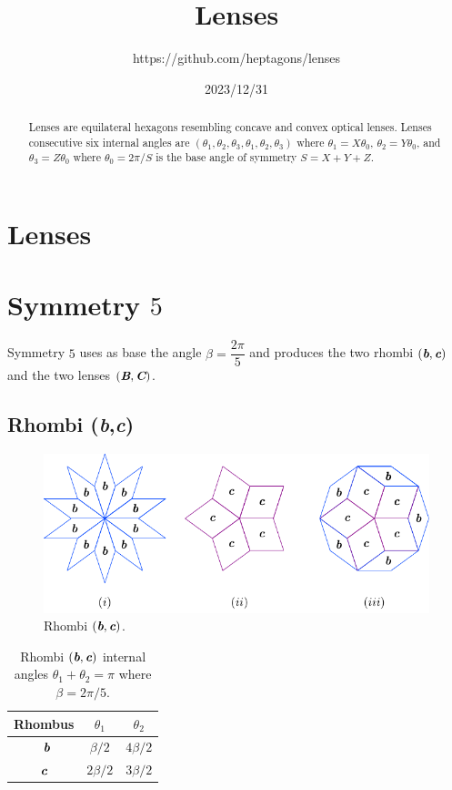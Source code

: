 \documentclass[11pt]{article}
\title{Lenses}
\author{https://github.com/heptagons/lenses}
\date{2023/12/31}
\def\mathbi#1{\textbf{\em #1}}
\begin{document}
\maketitle
\begin{abstract}
Lenses are equilateral hexagons resembling concave and convex optical lenses. Lenses consecutive six internal angles are $(\theta_1,\theta_2,\theta_3,\theta_1,\theta_2,\theta_3)$ where $\theta_1=X\theta_0$, $\theta_2=Y\theta_0$, and $\theta_3=Z\theta_0$ where $\theta_0 = 2\pi/S$ is the base angle of symmetry $S = X + Y + Z$.
\end{abstract}

\section{Lenses}

\section{Symmetry $5$}

Symmetry $5$ uses as base the angle $\beta = \dfrac{2\pi}5$ and produces the two rhombi $(\mathbi{b},\mathbi{c})$ and the two lenses $(\mathbi{B},\mathbi{C})$.


\subsection{Rhombi (\mathbi{b},\mathbi{c})}

\begin{figure}[H]
\centering
\includegraphics[scale=1.1]{bc/rhombi}
\caption{Rhombi $(\mathbi{b},\mathbi{c})$.}
\label{fig:bc-rhombi}
\end{figure}

\begin{table}[H]
\begin{center}
\begin{tabular}{|c|c c|}
\hline
Rhombus & $\theta_1$ & $\theta_2$ \\ %
\hline\
$\mathbi{b}$ & $\beta/2$ & $4\beta/2$ \\[0.5ex] \hline
$\mathbi{c}$ & $2\beta/2$ & $3\beta/2$ \\[0.5ex] \hline
\end{tabular}
\caption{Rhombi $(\mathbi{b},\mathbi{c})$ internal angles $\theta_1 + \theta_2 = \pi$ where $\beta = 2\pi/5$.} 
\label{tbl:bc-angles}
\end{center}
\end{table}
\end{document}
